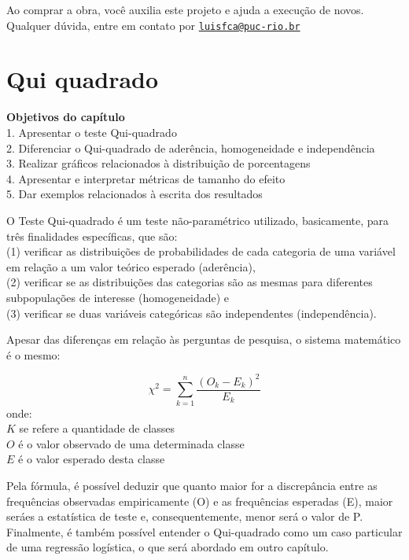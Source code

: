 \documentclass[
]{book}
\newenvironment{objectives}{
  \definecolor{shadecolor}{rgb}{0, 0, 0}  %
  \color{white}
  \begin{shaded}}
 {\end{shaded}}
\begin{document}
Ao comprar a obra, você auxilia este projeto e ajuda a execução de novos. Qualquer dúvida, entre em contato por \href{mailto:luisfca@puc-rio.br}{\nolinkurl{luisfca@puc-rio.br}}

\hypertarget{qui-quadrado}{%
\chapter{Qui quadrado}\label{qui-quadrado}}

\begin{objectives}
\textbf{Objetivos do capítulo}\\
1. Apresentar o teste Qui-quadrado\\
2. Diferenciar o Qui-quadrado de aderência, homogeneidade e independência\\
3. Realizar gráficos relacionados à distribuição de porcentagens\\
4. Apresentar e interpretar métricas de tamanho do efeito\\
5. Dar exemplos relacionados à escrita dos resultados

\end{objectives}

O Teste Qui-quadrado é um teste não-paramétrico utilizado, basicamente, para três finalidades específicas, que são:\\
(1) verificar as distribuições de probabilidades de cada categoria de uma variável em relação a um valor teórico esperado (aderência),\\
(2) verificar se as distribuições das categorias são as mesmas para diferentes subpopulações de interesse (homogeneidade) e\\
(3) verificar se duas variáveis categóricas são independentes (independência).

Apesar das diferenças em relação às perguntas de pesquisa, o sistema matemático é o mesmo:

\[\chi^2=\sum_{k=1}^{n} \frac{(O_k - E_k)^2}{E_k}\]
onde:\\
\(K\) se refere a quantidade de classes\\
\(O\) é o valor observado de uma determinada classe\\
\(E\) é o valor esperado desta classe

Pela fórmula, é possível deduzir que quanto maior for a discrepância entre as frequências observadas empiricamente (O) e as frequências esperadas (E), maior seráes a estatística de teste e, consequentemente, menor será o valor de P. Finalmente, é também possível entender o Qui-quadrado como um caso particular de uma regressão logística, o que será abordado em outro capítulo.
\end{document}
